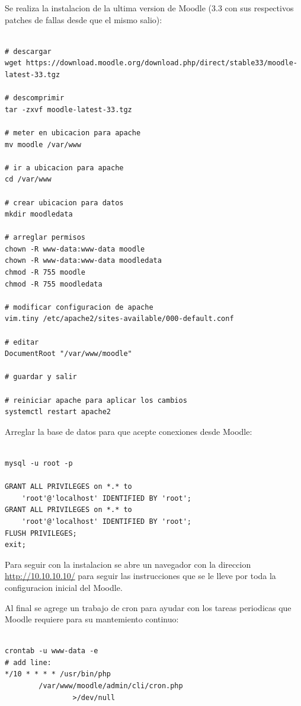 Se realiza la instalacion de la ultima version de Moodle (3.3 con sus respectivos patches de fallas desde que el mismo salio):

\begin{lstlisting}

# descargar
wget https://download.moodle.org/download.php/direct/stable33/moodle-latest-33.tgz

# descomprimir
tar -zxvf moodle-latest-33.tgz

# meter en ubicacion para apache
mv moodle /var/www

# ir a ubicacion para apache
cd /var/www

# crear ubicacion para datos
mkdir moodledata

# arreglar permisos
chown -R www-data:www-data moodle
chown -R www-data:www-data moodledata
chmod -R 755 moodle
chmod -R 755 moodledata

# modificar configuracion de apache
vim.tiny /etc/apache2/sites-available/000-default.conf

# editar
DocumentRoot "/var/www/moodle"

# guardar y salir

# reiniciar apache para aplicar los cambios
systemctl restart apache2

\end{lstlisting}

Arreglar la base de datos para que acepte conexiones desde Moodle:

\begin{lstlisting}

mysql -u root -p

GRANT ALL PRIVILEGES on *.* to
	'root'@'localhost' IDENTIFIED BY 'root';
GRANT ALL PRIVILEGES on *.* to
	'root'@'localhost' IDENTIFIED BY 'root';
FLUSH PRIVILEGES;
exit;

\end{lstlisting}

Para seguir con la instalacion se abre un navegador con la direccion \url{http://10.10.10.10/} para seguir las instrucciones que se le lleve por toda la configuracion inicial del Moodle.

Al final se agrege un trabajo de cron para ayudar con los tareas periodicas que Moodle requiere para su mantemiento continuo:

\begin{lstlisting}

crontab -u www-data -e
# add line:
*/10 * * * * /usr/bin/php
		/var/www/moodle/admin/cli/cron.php
        		>/dev/null

\end{lstlisting}

